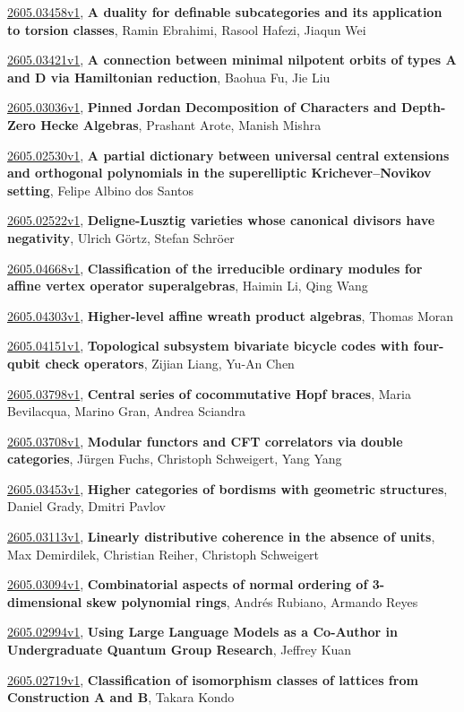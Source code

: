 \documentclass[9pt, a4paper]{article}
\theoremstyle{plain}
\theoremstyle{definition}
\theoremstyle{remark}
\newcommand{\arxiv}[3]{\href{https://arxiv.org/abs/#1}{#1}, \textbf{\textcolor{arxivblue}{#2}}, #3}
\begin{document}
\arxiv{2605.03458v1}{A duality for definable subcategories and its application to torsion classes}{Ramin Ebrahimi, Rasool Hafezi, Jiaqun Wei}

\arxiv{2605.03421v1}{A connection between minimal nilpotent orbits of types A and D via Hamiltonian reduction}{Baohua Fu, Jie Liu}

\arxiv{2605.03036v1}{Pinned Jordan Decomposition of Characters and Depth-Zero Hecke Algebras}{Prashant Arote, Manish Mishra}

\arxiv{2605.02530v1}{A partial dictionary between universal central extensions and orthogonal polynomials in the superelliptic Krichever--Novikov setting}{Felipe Albino dos Santos}

\arxiv{2605.02522v1}{Deligne-Lusztig varieties whose canonical divisors have negativity}{Ulrich Görtz, Stefan Schröer}

\arxiv{2605.04668v1}{Classification of the irreducible ordinary modules for affine vertex operator superalgebras}{Haimin Li, Qing Wang}

\arxiv{2605.04303v1}{Higher-level affine wreath product algebras}{Thomas Moran}

\arxiv{2605.04151v1}{Topological subsystem bivariate bicycle codes with four-qubit check operators}{Zijian Liang, Yu-An Chen}

\arxiv{2605.03798v1}{Central series of cocommutative Hopf braces}{Maria Bevilacqua, Marino Gran, Andrea Sciandra}

\arxiv{2605.03708v1}{Modular functors and CFT correlators via double categories}{Jürgen Fuchs, Christoph Schweigert, Yang Yang}

\arxiv{2605.03453v1}{Higher categories of bordisms with geometric structures}{Daniel Grady, Dmitri Pavlov}

\arxiv{2605.03113v1}{Linearly distributive coherence in the absence of units}{Max Demirdilek, Christian Reiher, Christoph Schweigert}

\arxiv{2605.03094v1}{Combinatorial aspects of normal ordering of 3-dimensional skew polynomial rings}{Andrés Rubiano, Armando Reyes}

\arxiv{2605.02994v1}{Using Large Language Models as a Co-Author in Undergraduate Quantum Group Research}{Jeffrey Kuan}

\arxiv{2605.02719v1}{Classification of isomorphism classes of lattices from Construction A and B}{Takara Kondo}

\end{document}
